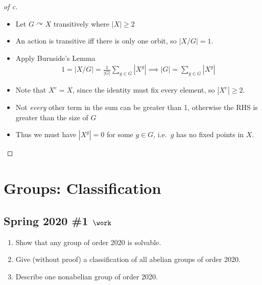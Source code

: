 \begin{solution}
\begin{proof}[of c]
\begin{itemize}
\tightlist
\item
  Let \(G\curvearrowright X\) transitively where
  \({\left\lvert {X} \right\rvert} \geq 2\)
\item
  An action is transitive iff there is only one orbit, so
  \({\left\lvert {X/G} \right\rvert} = 1\).
\item
  Apply Burnside's Lemma
  \begin{align*}
  1 = {\left\lvert {X/G} \right\rvert} = \frac{1}{{\left\lvert {G} \right\rvert}} \sum_{g\in G} {\left\lvert {X^g} \right\rvert} \implies {\left\lvert {G} \right\rvert} = \sum_{g\in G} {\left\lvert {X^g} \right\rvert}
  \end{align*}
\item
  Note that \(X^e = X\), since the identity must fix every element, so
  \({\left\lvert {X^e} \right\rvert} \geq 2\).
\item
  Not \emph{every} other term in the sum can be greater than 1,
  otherwise the RHS is greater than the size of \(G\)
\item
  Thus we must have \({\left\lvert {X^g} \right\rvert} = 0\) for some
  \(g\in G\), i.e.~\(g\) has no fixed points in \(X\).
\end{itemize}

\end{proof}

\end{solution}

\hypertarget{groups-classification}{%
\section{Groups: Classification}\label{groups-classification}}

\hypertarget{spring-2020-1-work}{%
\subsection{\texorpdfstring{Spring 2020 \#1
\(\work\)}{Spring 2020 \#1 \textbackslash work}}\label{spring-2020-1-work}}

\begin{enumerate}
\def\labelenumi{\alph{enumi}.}
\item
  Show that any group of order 2020 is solvable.
\item
  Give (without proof) a classification of all abelian groups of order
  2020.
\item
  Describe one nonabelian group of order 2020.
\end{enumerate}

